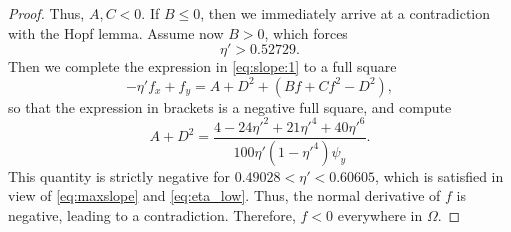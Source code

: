 \documentclass{amsart}
\theoremstyle{definition}
\begin{document}
\begin{proof}
	Thus, $A,C < 0$. If $B \leq 0$, then we immediately arrive at a contradiction with the Hopf lemma. Assume now $B>0$, which forces 
	\begin{equation}\label{eq:eta_low}
		\eta' > 0.52729.
	\end{equation}
	Then we complete the expression in \eqref{eq:slope:1} to a full square
	\[
	-\eta' f_x + f_y = A + D^2 + (B f + C f^2-D^2),
	\]
	so that the expression in brackets is a negative full square, and compute
	\[
	A + D^2 = \frac{4-24\eta'^2+21\eta'^4+40\eta'^6}{100 \eta'(1-\eta'^4)\psi_y}.
	\]
	This quantity is strictly negative for $0.49028 < \eta' < 0.60605$, which is satisfied in view of \eqref{eq:maxslope} and \eqref{eq:eta_low}. Thus, the normal derivative of $f$ is negative, leading to a contradiction. Therefore, $f < 0$ everywhere in $\Omega$.
\end{proof}
\end{document}
